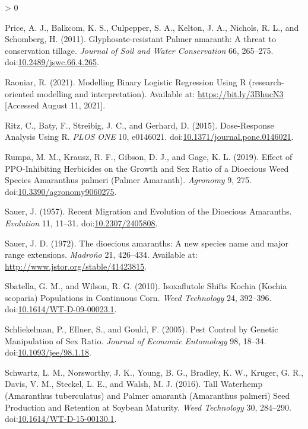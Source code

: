 \documentclass[utf8]{frontiersSCNS}
\newlength{\cslhangindent}
\newenvironment{CSLReferences}[2] %
 {%
  \setlength{\parindent}{0pt}
  \ifodd #1 \everypar{\setlength{\hangindent}{\cslhangindent}}\ignorespaces\fi
  \ifnum #2 > 0
  \setlength{\parskip}{#2\baselineskip}
  \fi
 }%
 {}
\begin{document}
\begin{CSLReferences}{1}{0}
\leavevmode\hypertarget{ref-price2011}{}%
Price, A. J., Balkcom, K. S., Culpepper, S. A., Kelton, J. A., Nichols,
R. L., and Schomberg, H. (2011). Glyphosate-resistant {Palmer} amaranth:
{A} threat to conservation tillage. \emph{Journal of Soil and Water
Conservation} 66, 265--275.
doi:\href{https://doi.org/10.2489/jswc.66.4.265}{10.2489/jswc.66.4.265}.

\leavevmode\hypertarget{ref-raoniar2021}{}%
Raoniar, R. (2021). Modelling {Binary Logistic Regression Using R}
(research-oriented modelling and interpretation). Available at:
\url{https://bit.ly/3BhucN3} {[}Accessed August 11, 2021{]}.

\leavevmode\hypertarget{ref-ritz2015}{}%
Ritz, C., Baty, F., Streibig, J. C., and Gerhard, D. (2015).
Dose-{Response Analysis Using R}. \emph{PLOS ONE} 10, e0146021.
doi:\href{https://doi.org/10.1371/journal.pone.0146021}{10.1371/journal.pone.0146021}.

\leavevmode\hypertarget{ref-rumpa2019}{}%
Rumpa, M. M., Krausz, R. F., Gibson, D. J., and Gage, K. L. (2019).
Effect of {PPO}-{Inhibiting Herbicides} on the {Growth} and {Sex Ratio}
of a {Dioecious Weed Species Amaranthus} palmeri ({Palmer Amaranth}).
\emph{Agronomy} 9, 275.
doi:\href{https://doi.org/10.3390/agronomy9060275}{10.3390/agronomy9060275}.

\leavevmode\hypertarget{ref-sauer1957}{}%
Sauer, J. (1957). Recent {Migration} and {Evolution} of the {Dioecious
Amaranths}. \emph{Evolution} 11, 11--31.
doi:\href{https://doi.org/10.2307/2405808}{10.2307/2405808}.

\leavevmode\hypertarget{ref-sauer1972}{}%
Sauer, J. D. (1972). The dioecious amaranths: A new species name and
major range extensions. \emph{Madroño} 21, 426--434. Available at:
\url{http://www.jstor.org/stable/41423815}.

\leavevmode\hypertarget{ref-sbatella2010}{}%
Sbatella, G. M., and Wilson, R. G. (2010). Isoxaflutole {Shifts Kochia}
({Kochia} scoparia) {Populations} in {Continuous Corn}. \emph{Weed
Technology} 24, 392--396.
doi:\href{https://doi.org/10.1614/WT-D-09-00023.1}{10.1614/WT-D-09-00023.1}.

\leavevmode\hypertarget{ref-schliekelman2005}{}%
Schliekelman, P., Ellner, S., and Gould, F. (2005). Pest {Control} by
{Genetic Manipulation} of {Sex Ratio}. \emph{Journal of Economic
Entomology} 98, 18--34.
doi:\href{https://doi.org/10.1093/jee/98.1.18}{10.1093/jee/98.1.18}.

\leavevmode\hypertarget{ref-schwartz2016}{}%
Schwartz, L. M., Norsworthy, J. K., Young, B. G., Bradley, K. W.,
Kruger, G. R., Davis, V. M., Steckel, L. E., and Walsh, M. J. (2016).
Tall {Waterhemp} ({Amaranthus} tuberculatus) and {Palmer} amaranth
({Amaranthus} palmeri) {Seed Production} and {Retention} at {Soybean
Maturity}. \emph{Weed Technology} 30, 284--290.
doi:\href{https://doi.org/10.1614/WT-D-15-00130.1}{10.1614/WT-D-15-00130.1}.


\end{CSLReferences}
\end{document}
